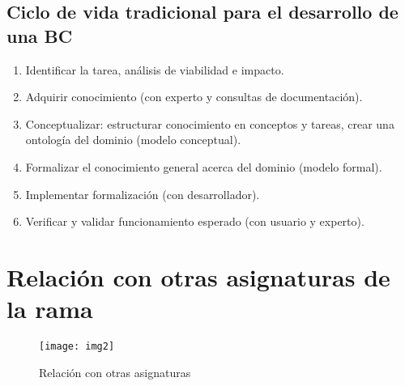 \documentclass[12pt]{article}
\begin{document}
\subsection{Ciclo de vida tradicional para el desarrollo de una BC}
\begin{enumerate}
\item Identificar la tarea, análisis de viabilidad e impacto.
\item Adquirir conocimiento (con experto y consultas de documentación).
\item Conceptualizar: estructurar conocimiento en conceptos y tareas, crear una ontología del dominio (modelo conceptual).
\item Formalizar el conocimiento general acerca del dominio (modelo formal).
\item Implementar formalización (con desarrollador).
\item Verificar y validar funcionamiento esperado (con usuario y experto).
\end{enumerate}

\section{Relación con otras asignaturas de la rama}
\begin{figure}[H]
\centering
\texttt{[image: img2]}
\caption{Relación con otras asignaturas} \label{fig:img2}
\end{figure}
\end{document}
